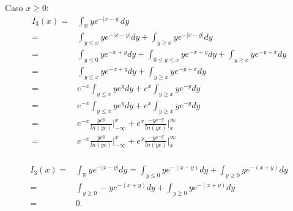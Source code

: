 \documentclass{article}
\begin{document}
\begin{enumerate}
\begin{enumerate}
\begin{enumerate}
\begin{enumerate}
					Caso $x \geq 0:$
					$$
					\begin{aligned}
					I_{3}(x) 
					= & \int_{\mathbb{R}} y e^{-|x-y|} dy \\
					= & \int_{y \leq x} y e^{-|x-y|} dy + \int_{y \geq x} y e^{-|x-y|} dy \\
					= & \int_{y \leq 0} y e^{-x+y} dy + \int_{0 \leq y \leq x} y e^{-x+y} dy + \int_{y \geq x} y e^{-y + x} dy \\
					= & \int_{y \leq x} y e^{-x+y} dy + \int_{y \geq x} y e^{-y + x} dy \\		
					= & e^{-x}\int_{y \leq x} y e^{y} dy + e^{x}\int_{y \geq x} y e^{-y } dy \\	
					= & e^{-x}\int_{y \leq x} y e^{y} dy + e^{x}\int_{y \geq x} y e^{-y } dy \\	
					= & e^{-x} \frac{ye^{y}}{ln(ye)} \Big|^{x}_{-\infty}+ e^{x} \frac{-ye^{-y}}{ln(ye)} \Big|^{\infty}_{x} \\
					= & e^{-x} \frac{ye^{y}}{ln(ye)} \Big|^{x}_{-\infty}+ e^{x} \frac{-ye^{-y}}{ln(ye)} \Big|^{\infty}_{x} \\
					\end{aligned}
					$$
					\end{enumerate}
				
					$$
					\begin{aligned}
				I_{3}(x)
						= & \int_{\mathbb{R}} y e^{-|x-y|} dy = \int_{y \leq 0 }ye^{-(x-y)} dy + \int_{y \geq 0 }ye^{-(x+y)} dy \\
						= & \int_{y \geq 0 }-ye^{-(x+y)} dy + \int_{y \geq 0 }ye^{-(x+y)} dy \\
						= & 0.
					\end{aligned}
					$$
				\end{enumerate}
			\end{enumerate}
	\end{enumerate}
		
\end{document}
